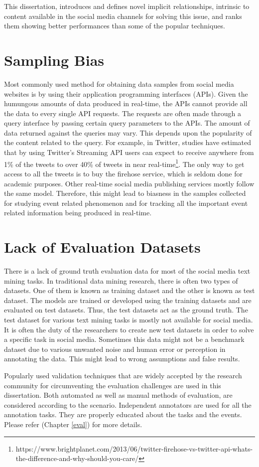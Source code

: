 This dissertation, introduces and defines novel implicit relationships, intrinsic to content available in the social media channels for solving this issue, and ranks them showing better performances than some of the popular techniques.  


\section{Sampling Bias}
Most commonly used method for obtaining data samples from social media websites is by using their application programming interfaces (APIs). Given the humungous amounts of data produced in real-time, the APIs cannot provide all the data to every single API requests. The requests are often made through a query interface by passing certain query parameters to the APIs. The amount of data returned against the queries may vary. This depends upon the popularity of the content related to the query. For example, in Twitter, studies have estimated that by using Twitter's Streaming API users can expect to receive anywhere from 1\% of the tweets to over 40\% of tweets in near real-time\footnote{https://www.brightplanet.com/2013/06/twitter-firehose-vs-twitter-api-whats-the-difference-and-why-should-you-care/}. The only way to get access to all the tweets is to buy the firehose service, which is seldom done for academic purposes. Other real-time social media publishing services mostly follow the same model. Therefore, this might lead to biasness in the samples collected for studying event related phenomenon and for tracking all the important event related information being produced in real-time.


\section{Lack of Evaluation Datasets}
There is a lack of ground truth evaluation data for most of the social media text mining tasks. In traditional data mining research, there is often two types of datasets. One of them is known as training dataset and the other is known as test dataset. The models are trained or developed using the training datasets and are evaluated on test datasets. Thus, the test datasets act as the ground truth. The test dataset for various text mining tasks is mostly not available for social media. It is often the duty of the researchers to create new test datasets in order to solve a specific task in social media. Sometimes this data might not be a benchmark dataset due to various unwanted noise and human error or perception in annotating the data. This might lead to wrong assumptions and false results.

Popularly used validation techniques that are widely accepted by the research community for circumventing the evaluation challenges are used in this dissertation. Both automated as well as manual methods of evaluation, are considered according to the scenario. Independent annotators are used for all the annotation tasks. They are properly educated about the tasks and the events. Please refer (Chapter \ref{eval}) for more details.
